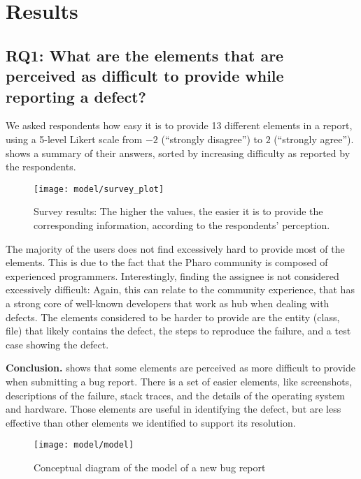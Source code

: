 
\section{Results} \label{sec:approach}

\subsection*{RQ1: What are the elements that are perceived as difficult to provide while reporting a defect?}

We asked respondents how easy it is to provide 13 different elements in a report, using a 5-level Likert scale from $-2$ (``strongly disagree'') to $2$ (``strongly agree'').  shows a summary of their answers, sorted by increasing difficulty as reported by the respondents.
\begin{figure}[h!]
\centering
\texttt{[image: model/survey\_plot]}
\label{fig:survey}
\caption{Survey results: The higher the values, the easier it is to provide the corresponding information, according to the respondents' perception.}
\end{figure}
The majority of the users does not find excessively hard to provide most of the elements. This is due to the fact that the Pharo community is composed of experienced programmers. Interestingly, finding the assignee is not considered excessively difficult: Again, this can relate to the community experience, that has a strong core of well-known developers that work as hub when dealing with defects. The elements considered to be harder to provide are the entity (\eg class, file) that likely contains the defect, the steps to reproduce the failure, and a test case showing the defect.

\textbf{Conclusion.}  shows that some elements are perceived as more difficult to provide when submitting a bug report. There is a set of easier elements, like screenshots, descriptions of the failure, stack traces, and the details of the operating system and hardware. Those elements are useful in identifying the defect, but are less effective than other elements we identified to support its resolution.


\begin{figure*}[ht]
\centering
\texttt{[image: model/model]}
\caption{Conceptual diagram of the model of a new bug report}
\label{fig:model}
\end{figure*}

